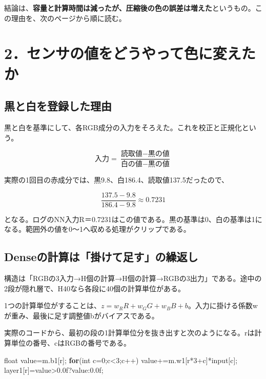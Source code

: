 \documentclass[
  11pt,
  a4paper,
]{article}
\newenvironment{Shaded}{}{}
\newcommand{\BuiltInTok}[1]{\textcolor[rgb]{0.00,0.50,0.00}{#1}}
\newcommand{\ControlFlowTok}[1]{\textcolor[rgb]{0.00,0.44,0.13}{\textbf{#1}}}
\newcommand{\DataTypeTok}[1]{\textcolor[rgb]{0.56,0.13,0.00}{#1}}
\newcommand{\DecValTok}[1]{\textcolor[rgb]{0.25,0.63,0.44}{#1}}
\newcommand{\FloatTok}[1]{\textcolor[rgb]{0.25,0.63,0.44}{#1}}
\newcommand{\NormalTok}[1]{#1}
\newcommand{\OperatorTok}[1]{\textcolor[rgb]{0.40,0.40,0.40}{#1}}
\begin{document}
結論は、\textbf{容量と計算時間は減ったが、圧縮後の色の誤差は増えた}というもの。この理由を、次のページから順に読む。

\newpage

\section{2．センサの値をどうやって色に変えたか}\label{ux30bbux30f3ux30b5ux306eux5024ux3092ux3069ux3046ux3084ux3063ux3066ux8272ux306bux5909ux3048ux305fux304b}

\subsection{黒と白を登録した理由}\label{ux9ed2ux3068ux767dux3092ux767bux9332ux3057ux305fux7406ux7531}

黒と白を基準にして、各RGB成分の入力をそろえた。これを校正と正規化という。

\[\text{入力}=\frac{\text{読取値}-\text{黒の値}}{\text{白の値}-\text{黒の値}}\]

実際の1回目の赤成分では、黒9.8、白186.4、読取値137.5だったので、

\[\frac{137.5-9.8}{186.4-9.8}\approx0.7231\]

となる。ログのNN入力R＝0.7231はこの値である。黒の基準は0、白の基準は1になる。範囲外の値を0〜1へ収める処理がクリップである。

\subsection{Denseの計算は「掛けて足す」の繰返し}\label{denseux306eux8a08ux7b97ux306fux639bux3051ux3066ux8db3ux3059ux306eux7e70ux8fd4ux3057}

構造は「RGBの3入力→H個の計算→H個の計算→RGBの3出力」である。途中の2段が隠れ層で、H40なら各段に40個の計算単位がある。

1つの計算単位がすることは、\(z=w_RR+w_GG+w_BB+b\)。入力に掛ける係数wが重み、最後に足す調整値bがバイアスである。

実際のコードから、最初の段の1計算単位分を抜き出すと次のようになる。rは計算単位の番号、cはRGBの番号である。

\begin{Shaded}
\begin{Highlighting}[]
\DataTypeTok{float}\NormalTok{ value}\OperatorTok{=}\NormalTok{m}\OperatorTok{.}\NormalTok{b1}\OperatorTok{[}\NormalTok{r}\OperatorTok{];}
\ControlFlowTok{for}\OperatorTok{(}\DataTypeTok{int}\NormalTok{ c}\OperatorTok{=}\DecValTok{0}\OperatorTok{;}\NormalTok{c}\OperatorTok{\textless{}}\DecValTok{3}\OperatorTok{;}\NormalTok{c}\OperatorTok{++)}\NormalTok{ value}\OperatorTok{+=}\NormalTok{m}\OperatorTok{.}\NormalTok{w1}\OperatorTok{[}\NormalTok{r}\OperatorTok{*}\DecValTok{3}\OperatorTok{+}\NormalTok{c}\OperatorTok{]*}\NormalTok{input}\OperatorTok{[}\NormalTok{c}\OperatorTok{];}
\NormalTok{layer1}\OperatorTok{[}\NormalTok{r}\OperatorTok{]=}\NormalTok{value}\OperatorTok{\textgreater{}}\FloatTok{0.0}\BuiltInTok{f}\OperatorTok{?}\NormalTok{value}\OperatorTok{:}\FloatTok{0.0}\BuiltInTok{f}\OperatorTok{;}
\end{Highlighting}
\end{Shaded}
\end{document}
